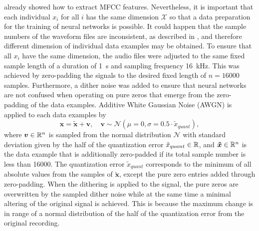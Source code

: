  already showed how to extract MFCC features.
Nevertheless, it is important that each individual $x_i$ for all $i$ has the same dimension $\mathcal{X}$ so that a data preparation for the training of neural networks is possible.
It could happen that the sample numbers of the waveform files are inconsistent, as described in , and therefore different dimension of individual data examples may be obtained.
To ensure that all $x_i$ have the same dimension, the audio files were adjusted to the same fixed sample length of a duration of \SI{1}{\second} and sampling frequency \SI{16}{\kilo\hertz}.
This was achieved by zero-padding the signals to the desired fixed length of $n = 16000$ samples.
Furthermore, a dither noise was added to ensure that neural networks are not confused when operating on pure zeros that emerge from the zero-padding of the data examples.
Additive White Gaussian Noise (AWGN) is applied to each data examples by
\begin{equation}\label{eq:exp_dither}
  \bm{x} = \bm{\tilde{x}} + \bm{v}, \quad \bm{v} \sim \mathcal{N}(\mu=0, \sigma=0.5 \cdot \tilde{x}_{quant}),
\end{equation}
where $\bm{v} \in \mathbb{R}^n$ is sampled from the normal distribution $\mathcal{N}$ with standard deviation given by the half of the quantization error $\tilde{x}_{quant} \in \mathbb{R}$, and $\bm{\tilde{x}} \in \mathbb{R}^n$ is the data example that is additionally zero-padded if its total sample number is less than 16000.
The quantization error $\tilde{x}_{quant}$ corresponds to the minimum of all absolute values from the samples of $\bm{\tilde{x}}$, except the pure zero entries added through zero-padding.
When the dithering is applied to the signal, the pure zeros are overwritten by the sampled dither noise while at the same time a minimal altering of the original signal is achieved.
This is because the maximum change is in range of a normal distribution of the half of the quantization error from the original recording.